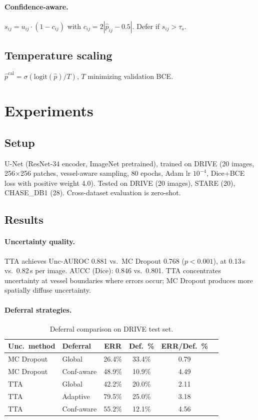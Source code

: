 \documentclass[smallextended]{svjour3}
\begin{document}
\paragraph{Confidence-aware.} $s_{ij} = u_{ij} \cdot (1 - c_{ij})$ with
$c_{ij} = 2|\hat{p}_{ij} - 0.5|$. Defer if $s_{ij} > \tau_s$.

\subsection{Temperature scaling}

$\hat{p}^{\text{cal}} = \sigma(\text{logit}(\hat{p})/T)$, $T$ minimizing
validation BCE.

\section{Experiments}

\subsection{Setup}

U-Net (ResNet-34 encoder, ImageNet pretrained), trained on DRIVE (20 images,
256$\times$256 patches, vessel-aware sampling, 80 epochs, Adam lr $10^{-4}$,
Dice+BCE loss with positive weight 4.0). Tested on DRIVE (20 images), STARE
(20), CHASE\_DB1 (28). Cross-dataset evaluation is zero-shot.

\subsection{Results}

\paragraph{Uncertainty quality.}
TTA achieves Unc-AUROC 0.881 vs.\ MC Dropout 0.768 ($p < 0.001$), at 0.13\,s
vs.\ 0.82\,s per image. AUCC (Dice): 0.846 vs.\ 0.801. TTA concentrates
uncertainty at vessel boundaries where errors occur; MC Dropout produces
more spatially diffuse uncertainty.

\paragraph{Deferral strategies.}
\begin{table}[t]
\centering
\caption{Deferral comparison on DRIVE test set.}
\small
\begin{tabular}{llcccc}
\toprule
Unc.\ method & Deferral & ERR & Def.\ \% & ERR/Def.\ \% \\
\midrule
MC Dropout & Global & 26.4\% & 33.4\% & 0.79 \\
MC Dropout & Conf-aware & 48.9\% & 10.9\% & 4.49 \\
TTA & Global & 42.2\% & 20.0\% & 2.11 \\
TTA & Adaptive & 79.5\% & 25.0\% & 3.18 \\
TTA & Conf-aware & 55.2\% & 12.1\% & 4.56 \\
\bottomrule
\end{tabular}
\label{tab:deferral}
\end{table}
\end{document}
